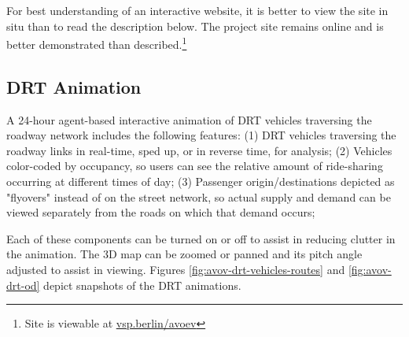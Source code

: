 For best understanding of an interactive website, it is better to view the site in situ than to read the description below. The project site remains online and is better demonstrated than described.\footnote{Site is viewable at \href{https://vsp.berlin/avoev/}{vsp.berlin/avoev}}

\subsection{DRT Animation}

A 24-hour agent-based interactive animation of DRT vehicles traversing the roadway network includes the following features: (1) DRT vehicles traversing the roadway links in real-time, sped up, or in reverse time, for analysis; (2) Vehicles color-coded by occupancy, so users can see the relative amount of ride-sharing occurring at different times of day; (3) Passenger origin/destinations depicted as "flyovers" instead of on the street network, so actual supply and demand can be viewed separately from the roads on which that demand occurs;

Each of these components can be turned on or off to assist in reducing clutter in the animation. The 3D map can be zoomed or panned and its pitch angle adjusted to assist in viewing. Figures \ref{fig:avov-drt-vehicles-routes} and \ref{fig:avov-drt-od} depict snapshots of the DRT animations.

